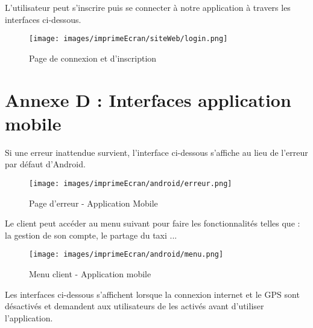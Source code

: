 {\vspace*{0.7cm}
L’utilisateur peut s’inscrire puis se connecter à notre application à travers les interfaces ci-dessous.

\begin{figure}[H]
\centering
\texttt{[image: images/imprimeEcran/siteWeb/login.png]}
\caption{Page de connexion et d'inscription}
\end{figure}





\section*{Annexe D : Interfaces application mobile}


\begin{minipage}[c]{.35\linewidth}
Si une erreur inattendue survient, l’interface ci-dessous s’affiche au lieu de l’erreur par défaut d’Android.
 \end{minipage}\hfill
\begin{minipage}[c]{.6\linewidth}
\begin{figure}[H]
\centering
\texttt{[image: images/imprimeEcran/android/erreur.png]}
\caption{Page d'erreur - Application Mobile}
\end{figure}

\end{minipage}


\vspace{1cm}
\begin{minipage}[c]{.35\linewidth}
Le client peut accéder au menu suivant pour faire les fonctionnalités telles que : la gestion de son compte, le partage du taxi ...
 \end{minipage}\hfill
\begin{minipage}[c]{.6\linewidth}
\begin{figure}[H]
\centering
\texttt{[image: images/imprimeEcran/android/menu.png]}
\caption{Menu client - Application mobile}
\end{figure}

\end{minipage}



\newpage
Les interfaces ci-dessous s’affichent lorsque la connexion internet et le GPS sont désactivés et demandent aux utilisateurs de les activés avant d’utiliser l’application.\\


}
